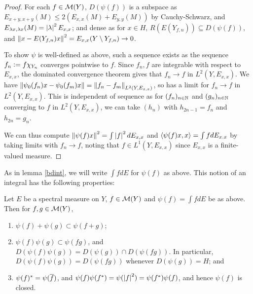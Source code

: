\documentclass[10pt]{amsart}
\begin{document}
\begin{proof}
    For each $f \in \mathcal{M}(Y)$, $D(\psi(f))$ is a subspace as $E_{x + y, x + y}(M) \leq 2(E_{x, x}(M) + E_{y, y}(M))$ by Cauchy-Schwarz, and $E_{\lambda x, \lambda x}(M) = \left| \lambda \right|^2E_{x, x}$; and dense as for $x \in H$, $R(E(Y_{f, n})) \subseteq D(\psi(f))$, and $\left\| x - E(Y_{f, n})x \right\|^2 = E_{x, x}(Y \setminus Y_{f, n}) \to 0$. 
    
    To show $\psi$ is well-defined as above, such a sequence exists as the sequence $f_n \vcentcolon= f \chi_{Y_n}$ converges pointwise to $f$. Since $f_n, f$ are integrable with respect to $E_{x, x}$, the dominated convergence theorem gives that $f_n \to f$ in $L^2(Y, E_{x, x})$. We have $\left\| \psi_0(f_n)x - \psi_0(f_m)x \right\| = \left\| f_n - f_m \right\|_{L^2(Y, E_{x, x})}$, so has a limit for $f_n \to f$ in $L^2(Y, E_{x, x})$. This is independent of sequence as for $(f_n)_{n \in \mathbb{N}}$ and $(g_n)_{n \in \mathbb{N}}$ converging to $f$ in $L^2(Y, E_{x, x})$, we can take $(h_n)$ with $h_{2n - 1} = f_n$ and $h_{2n} = g_n$. 

    We can thus compute $\left\| \psi(f)x \right\|^2 = \int \left| f \right|^2dE_{x, x}$ and $\left\langle \psi(f)x, x \right\rangle = \int f dE_{x. x}$ by taking limits with $f_n \to f$, noting that $f \in L^1(Y, E_{x, x})$ since $E_{x, x}$ is a finite-valued measure.
\end{proof}
As in lemma \ref{bdint}, we will write $\int f dE$ for $\psi(f)$ as above. This notion of an integral has the following properties:
\begin{proposition}\label{psiprops}
    Let $E$ be a spectral measure on $Y$, $f \in \mathcal{M}(Y)$ and $\psi(f) = \int f dE$ be as above. Then for $f, g \in \mathcal{M}(Y)$,
    \begin{enumerate}
        \item $\psi(f) + \psi(g) \subset \psi(f + g)$;
        \item $\psi(f)\psi(g) \subset \psi(fg)$, and $D(\psi(f)\psi(g)) = D(\psi(g)) \cap D(\psi(fg))$. In particular, $D(\psi(f)\psi(g)) = D(\psi(fg))$ whenever $D(\psi(g)) = H$; and
        \item $\psi(f)^* = \psi(\overline{f})$, and $\psi(f)\psi(f^*) = \psi(\left| f \right|^2) = \psi(f^*)\psi(f)$, and hence $\psi(f)$ is closed.
    \end{enumerate}
\end{proposition}
\end{document}

